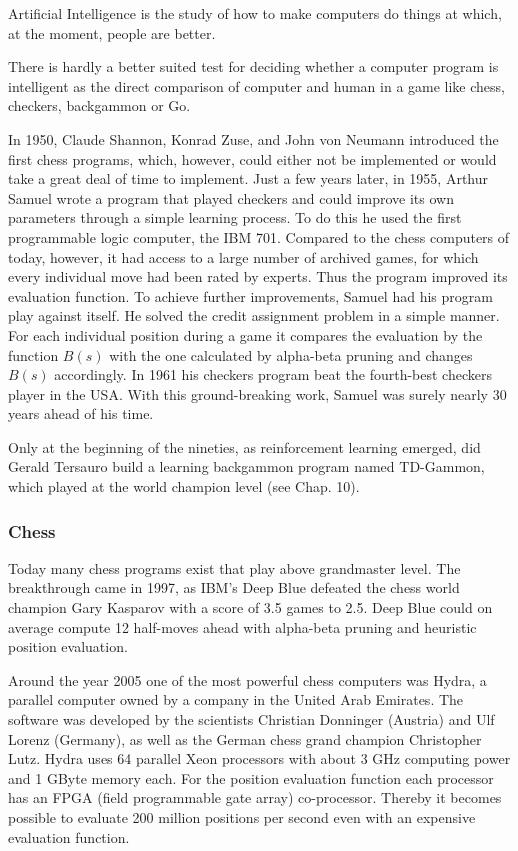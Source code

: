 \documentclass[10pt]{book}
\begin{document}
Artificial Intelligence is the study of how to make computers do things at which, at the moment, people are better.

There is hardly a better suited test for deciding whether a computer program is intelligent as the direct comparison of computer and human in a game like chess, checkers, backgammon or Go.

In 1950, Claude Shannon, Konrad Zuse, and John von Neumann introduced the first chess programs, which, however, could either not be implemented or would take a great deal of time to implement. Just a few years later, in 1955, Arthur Samuel wrote a program that played checkers and could improve its own parameters through a simple learning process. To do this he used the first programmable logic computer, the IBM 701. Compared to the chess computers of today, however, it had access to a large number of archived games, for which every individual move had been rated by experts. Thus the program improved its evaluation function. To achieve further improvements, Samuel had his program play against itself. He solved the credit assignment problem in a simple manner. For each individual position during a game it compares the evaluation by the function $B(s)$ with the one calculated by alpha-beta pruning and changes $B(s)$ accordingly. In 1961 his checkers program beat the fourth-best checkers player in the USA. With this ground-breaking work, Samuel was surely nearly 30 years ahead of his time.

Only at the beginning of the nineties, as reinforcement learning emerged, did Gerald Tersauro build a learning backgammon program named TD-Gammon, which played at the world champion level (see Chap. 10).

\subsubsection*{Chess}
Today many chess programs exist that play above grandmaster level. The breakthrough came in 1997, as IBM's Deep Blue defeated the chess world champion Gary Kasparov with a score of 3.5 games to 2.5. Deep Blue could on average compute 12 half-moves ahead with alpha-beta pruning and heuristic position evaluation.

Around the year 2005 one of the most powerful chess computers was Hydra, a parallel computer owned by a company in the United Arab Emirates. The software was developed by the scientists Christian Donninger (Austria) and Ulf Lorenz (Germany), as well as the German chess grand champion Christopher Lutz. Hydra uses 64 parallel Xeon processors with about 3 GHz computing power and 1 GByte memory each. For the position evaluation function each processor has an FPGA (field programmable gate array) co-processor. Thereby it becomes possible to evaluate 200 million positions per second even with an expensive evaluation function.
\end{document}
